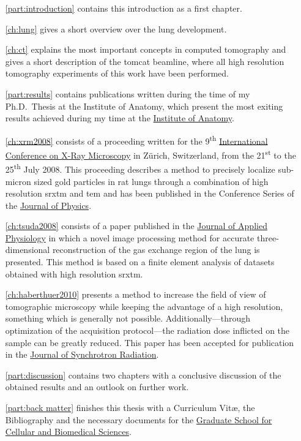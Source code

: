 \begin{itemize}
	\item [\autoref{part:introduction}] contains this introduction as a first chapter.
		
		\autoref{ch:lung} gives a short overview over the lung development.
	
		\autoref{ch:ct} explains the most important concepts in computed tomography and gives a short description of the \ac{tomcat} beamline, where all high resolution tomography experiments of this work have been performed.
	\item [\autoref{part:results}] contains publications written during the time of my Ph.D.\ Thesis at the Institute of Anatomy, which present the most exiting results achieved during my time at the \href{http://www.ana.unibe.ch/index_e.jsp}{Institute of Anatomy}.
	
		\autoref{ch:xrm2008} consists of a proceeding written for the 9\textsuperscript{th} \href{http://xrm2008.web.psi.ch/}{International Conference on X-Ray Microscopy} in Zürich, Switzerland, from the 21\textsuperscript{st} to the 25\textsuperscript{th} July 2008. This proceeding describes a method to precisely localize sub-micron sized gold particles in rat lungs through a combination of high resolution \acl{srxtm} and \acl{tem} and has been published in the Conference Series of the \href{http://iopscience.iop.org/1742-6596/}{Journal of Physics}.
		
		\autoref{ch:tsuda2008} consists of a paper published in the \href{http://jap.physiology.org/}{Journal of Applied Physiology} in which a novel image processing method for accurate three-dimensional reconstruction of the gas exchange region of the lung is presented. This method is based on a finite element analysis of datasets obtained with high resolution \acl{srxtm}.

		\autoref{ch:haberthuer2010} presents a method to increase the field of view of tomographic microscopy while keeping the advantage of a high resolution, something which is generally not possible. Additionally---through optimization of the acquisition protocol---the radiation dose inflicted on the sample can be greatly reduced. This paper has been accepted for publication in the \href{http://journals.iucr.org/s/}{Journal of Synchrotron Radiation}.

	\item [\autoref{part:discussion}] contains two chapters with a conclusive discussion of the obtained results and an outlook on further work.
	\item [\autoref{part:back matter}] finishes this thesis with a Curriculum Vit\ae, the Bibliography and the necessary documents for the \href{http://www.gcb.unibe.ch}{Graduate School for Cellular and Biomedical Sciences}.
\end{itemize}